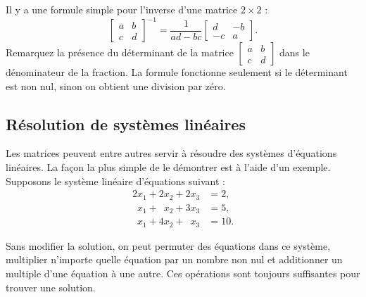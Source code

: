 Il y a une formule simple pour l'inverse d'une matrice $2 \times 2$ :
\begin{equation*}
\begin{bmatrix}
a & b \\
c & d
\end{bmatrix}^{-1}
=
\frac{1}{ad-bc}
\begin{bmatrix}
d & -b \\
-c & a
\end{bmatrix} .
\end{equation*}
Remarquez la présence du déterminant de la matrice 
$[\begin{smallmatrix}a&b\\c&d\end{smallmatrix}]$
dans le dénominateur de la fraction. La formule fonctionne seulement si le déterminant est non nul, sinon on obtient une division par zéro.

\subsection{Résolution de systèmes linéaires}

Les matrices peuvent entre autres servir à résoudre des systèmes d'équations linéaires. La façon la plus simple de le démontrer est à l'aide d'un exemple. Supposons le système linéaire d'équations suivant :
\begin{align*}
     2 x_1 +      2 x_2 +      2 x_3 & = 2 , \\
\phantom{9} x_1 + \phantom{9} x_2 +      3 x_3 & = 5 , \\
\phantom{9} x_1 +      4 x_2 + \phantom{9} x_3 & = 10 .
\end{align*}

Sans modifier la solution, on peut permuter des équations dans ce système, multiplier n'importe quelle équation par un nombre non nul et additionner un multiple d'une équation à une autre. Ces opérations sont toujours suffisantes pour trouver une solution.

